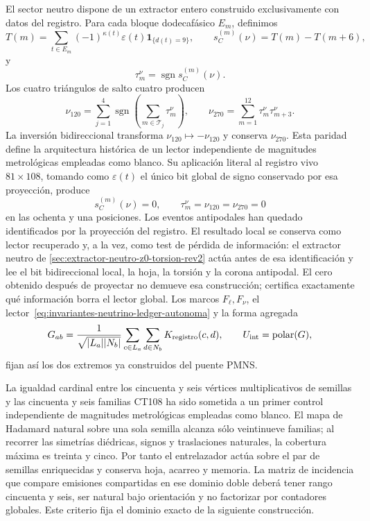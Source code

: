 El sector neutro dispone de un extractor entero construido exclusivamente
con datos del registro. Para cada bloque dodecafásico \(E_m\), definimos
\begin{equation}
 T(m)=\sum_{t\in E_m}(-1)^{\kappa(t)}\varepsilon(t)
       \mathbf1_{\{d(t)=9\}},
 \qquad
 s_C^{(m)}(\nu)=T(m)-T(m+6),
 \label{eq:lector-neutrino-ledger-autonoma}
\end{equation}
y
\begin{equation}
 \tau_m^\nu=\operatorname{sgn}s_C^{(m)}(\nu).
 \label{eq:trit-neutrino-ledger-autonoma}
\end{equation}
Los cuatro triángulos de salto cuatro producen
\begin{equation}
 \nu_{120}=\sum_{j=1}^{4}
 \operatorname{sgn}\!\left(\sum_{m\in\mathcal T_j}\tau_m^\nu\right),
 \qquad
 \nu_{270}=\sum_{m=1}^{12}\tau_m^\nu\tau_{m+3}^\nu.
 \label{eq:invariantes-neutrino-ledger-autonoma}
\end{equation}
La inversión bidireccional transforma
\(\nu_{120}\mapsto-\nu_{120}\) y conserva \(\nu_{270}\). Esta paridad
define la arquitectura histórica de un lector independiente de magnitudes
metrológicas empleadas como blanco. Su aplicación
literal al registro vivo \(81\times108\), tomando como
\(\varepsilon(t)\) el único bit global de signo conservado por esa
proyección, produce
\[
 s_C^{(m)}(\nu)=0,
 \qquad \tau_m^\nu=\nu_{120}=\nu_{270}=0
\]
en las ochenta y una posiciones. Los eventos antipodales han quedado
identificados por la proyección del registro. El resultado local se conserva
como lector recuperado y, a la vez, como test de pérdida de información: el
extractor neutro de
\cref{sec:extractor-neutro-z0-torsion-rev2} actúa antes de esa
identificación y lee el bit bidireccional local, la hoja, la torsión y la
corona antipodal. El cero obtenido después de proyectar no demueve esa
construcción; certifica exactamente qué información borra el lector global.
Los marcos
\(F_\ell,F_\nu\), el lector~\eqref{eq:invariantes-neutrino-ledger-autonoma}
y la forma agregada
\begin{equation}
 G_{ab}=\frac1{\sqrt{|L_a||N_b|}}
 \sum_{c\in L_a}\sum_{d\in N_b}K_{\rm registro}(c,d),
 \qquad U_{\rm int}=\operatorname{polar}(G),
 \label{eq:kernel-ledger-pmns-autonoma}
\end{equation}
fijan así los dos extremos ya construidos del puente PMNS.

La igualdad cardinal entre los cincuenta y seis vértices multiplicativos de
semillas y las cincuenta y seis familias CT108 ha sido sometida a un primer
control independiente de magnitudes metrológicas empleadas como blanco. El
mapa de Hadamard natural sobre una sola semilla alcanza
sólo veintinueve familias; al recorrer las simetrías diédricas, signos y
traslaciones naturales, la cobertura máxima es treinta y cinco. Por tanto el
entrelazador actúa sobre el par de semillas enriquecidas y conserva hoja,
acarreo y memoria. La matriz de incidencia que compare emisiones compartidas
en ese dominio doble deberá tener rango cincuenta y seis, ser natural bajo
orientación y no factorizar por contadores globales. Este criterio fija el
dominio exacto de la siguiente construcción.
